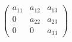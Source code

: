\documentclass[nofonts]{ctexart}
\begin{document}
\[
	\begin{pmatrix}
		a_{11}	& a_{12}	& a_{13}	\\
		0	& a_{22}	& a_{23}	\\
		0	& 0		& a_{33}
	\end{pmatrix}
\]
\end{document}
